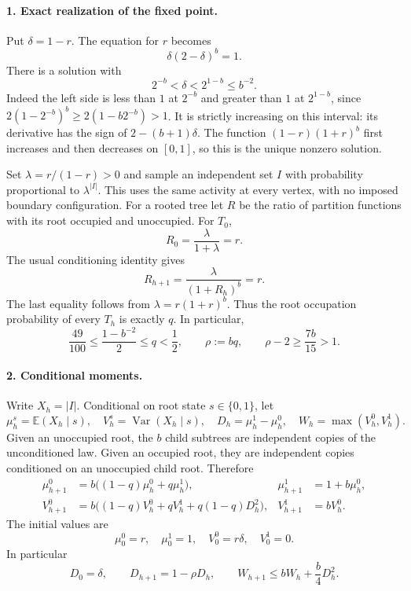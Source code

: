 \documentclass[11pt]{article}
\newcommand{\Var}{\operatorname{Var}}
\newcommand{\E}{\mathbb E}
\begin{document}
\paragraph{1. Exact realization of the fixed point.}
Put $\delta=1-r$. The equation for $r$ becomes
\[
 \delta(2-\delta)^b=1.
\]
There is a solution with
\begin{equation}\label{eq:delta}
 2^{-b}<\delta<2^{1-b}\le b^{-2}.
\end{equation}
Indeed the left side is less than $1$ at $2^{-b}$ and greater than $1$ at $2^{1-b}$, since
$2(1-2^{-b})^b\ge2(1-b2^{-b})>1$. It is strictly increasing on this interval: its derivative has the sign of $2-(b+1)\delta$.
The function $(1-r)(1+r)^b$ first increases and then decreases on $[0,1]$, so this is the unique nonzero solution.

Set $\lambda=r/(1-r)>0$ and sample an independent set $I$ with probability proportional to $\lambda^{|I|}$. This uses the same activity at every vertex, with no imposed boundary configuration. For a rooted tree let $R$ be the ratio of partition functions with its root occupied and unoccupied. For $T_0$,
\[
 R_0=\frac{\lambda}{1+\lambda}=r.
\]
The usual conditioning identity gives
\[
 R_{h+1}=\frac{\lambda}{(1+R_h)^b}=r.
\]
The last equality follows from $\lambda=r(1+r)^b$. Thus the root occupation probability of every $T_h$ is exactly $q$. In particular,
\begin{equation}\label{eq:q}
 \frac{49}{100}\le\frac{1-b^{-2}}2\le q<\frac12,
 \qquad \rho:=bq,\qquad \rho-2\ge\frac{7b}{15}>1.
\end{equation}

\paragraph{2. Conditional moments.}
Write $X_h=|I|$. Conditional on root state $s\in\{0,1\}$, let
\[
 \mu_h^s=\E(X_h\mid s),\quad V_h^s=\Var(X_h\mid s),\quad
 D_h=\mu_h^1-\mu_h^0,\quad W_h=\max(V_h^0,V_h^1).
\]
Given an unoccupied root, the $b$ child subtrees are independent copies of the unconditioned law. Given an occupied root, they are independent copies conditioned on an unoccupied child root. Therefore
\begin{align}
 \mu_{h+1}^0&=b\big((1-q)\mu_h^0+q\mu_h^1\big),&
 \mu_{h+1}^1&=1+b\mu_h^0,\label{eq:means}\\
 V_{h+1}^0&=b\big((1-q)V_h^0+qV_h^1+q(1-q)D_h^2\big),&
 V_{h+1}^1&=bV_h^0.\label{eq:vars}
\end{align}
The initial values are
\[
 \mu_0^0=r,\quad\mu_0^1=1,\quad V_0^0=r\delta,\quad V_0^1=0.
\]
In particular
\begin{equation}\label{eq:D}
 D_0=\delta,\qquad D_{h+1}=1-\rho D_h,
 \qquad W_{h+1}\le bW_h+\frac b4D_h^2.
\end{equation}
\end{document}
